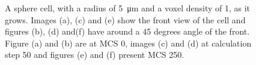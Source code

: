 \begin{figure}[ht]
\begin{center}
{	}
	\end{center}
	\caption[Growth of a sphere cell with a radius of 5]{\label{img:GrowthSphereCellRadius5}A sphere cell, with a radius of \SI{5}{\micro\metre} and a voxel density of 1, as it grows. Images (a), (c) and (e) show the front view of the cell and figures (b), (d) and(f) have around a 45 degrees angle of the front. Figure (a) and (b) are at \ac{MCS} 0, images (c) and (d) at calculation step 50 and figures (e) and (f) present \ac{MCS} 250.}
\end{figure}

